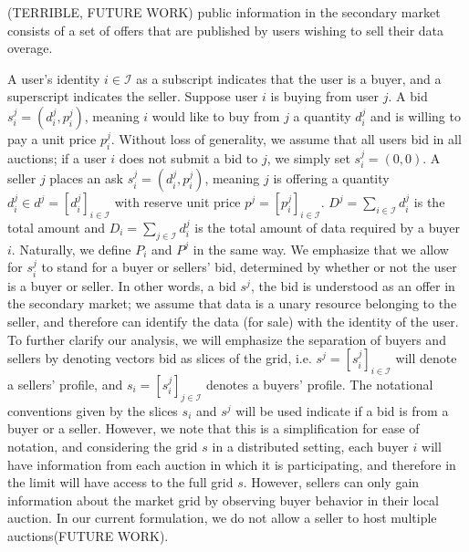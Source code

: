 \documentclass[12pt]{article}
\theoremstyle{definition}
\newcommand{\mcI}{\mathcal{I}}
\begin{document}
\begin{multicols}{2}
(TERRIBLE, FUTURE WORK) public information in the
secondary market consists of a set of offers that are published by users
wishing to sell their data overage. 

A user's identity $i \in \mcI$ as a subscript indicates that the user
is a buyer, and a superscript indicates the seller.
Suppose user $i$ is buying from user $j$. A bid $s_i^j = (d_i^j, p_i^j)$,
meaning $i$ would like to buy from $j$ a quantity $d^j_i$ and is willing to pay
a unit price $p^j_i$. Without loss of generality, we assume that all users bid in all
auctions; if a user $i$ does not submit a bid to $j$, we simply set $s_i^j = (0,0)$.
A seller $j$ places an ask $s_i^j = (d_i^j, p_i^j)$, meaning $j$ is offering a
quantity $d_i^j \in d^j = [d_i^j]_{i\in\mcI}$ 
with reserve unit price $p^j = [p_i^j]_{i\in\mcI}$. $D^j = \sum_{i\in\mcI}
d_i^j$ is the total amount and $D_i = \sum_{j\in\mcI} d_i^j$ is the
total amount of data required by a buyer $i$. Naturally, we define $P_i$ and
$P^j$ in the same way.
We emphasize that we allow for $s_i^j$ to
stand for a buyer or sellers' bid, determined by whether or not the user is a
buyer or seller. In other words, a bid $s^j$, the bid is understood as an offer in the secondary
market; we assume that data is a unary resource belonging to the seller, and
therefore can identify the data (for sale) with the identity of the user.
To further clarify our analysis, we will emphasize the separation of buyers and
sellers by denoting vectors bid as slices of the
grid, i.e. $s^j = [s_i^j]_{i\in\mcI}$ will denote a sellers' profile, and  $s_i =
[s_i^j]_{j\in\mcI}$ denotes a buyers' profile. 
The notational conventions given by the slices $s_i$
and $s^j$ will be used indicate if a bid is from a buyer or a seller. However,
we note that this is a simplification for ease of notation, and considering the
grid $s$ in a distributed setting, each buyer $i$ will
have information from each auction in which it is participating, and therefore
in the limit will have access to the full grid $s$. However, 
sellers can only gain information about the market grid by observing buyer
behavior in their local auction.
In our current formulation, we do not allow a seller to host multiple auctions(FUTURE WORK).



\end{multicols}
\end{document}
